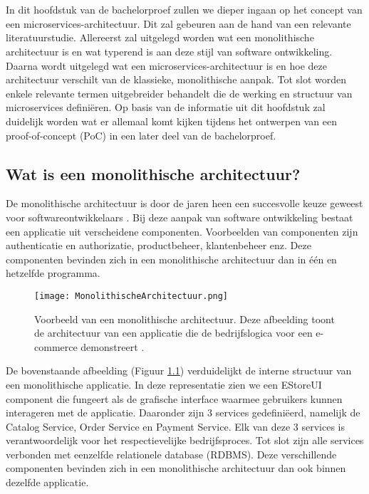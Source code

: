 \chapter{}%
\label{ch:stand-van-zaken}

In dit hoofdstuk van de bachelorproef zullen we dieper ingaan op het concept van een microservices-architectuur. Dit zal gebeuren aan de hand van een relevante literatuurstudie. Allereerst zal uitgelegd worden wat een monolithische architectuur is en wat typerend is aan deze stijl van software ontwikkeling. Daarna wordt uitgelegd wat een microservices-architectuur is en hoe deze architectuur verschilt van de klassieke, monolithische aanpak. Tot slot worden enkele relevante termen uitgebreider behandelt die de werking en structuur van microservices definiëren. Op basis van de informatie uit dit hoofdstuk zal duidelijk worden wat er allemaal komt kijken tijdens het ontwerpen van een proof-of-concept (PoC) in een later deel van de bachelorproef.

\section{Wat is een monolithische architectuur?}

De monolithische architectuur is door de jaren heen een succesvolle keuze geweest voor softwareontwikkelaars \autocite{Gos2020}. Bij deze aanpak van software ontwikkeling bestaat een applicatie uit verscheidene componenten. Voorbeelden van componenten zijn authenticatie en authorizatie, productbeheer, klantenbeheer enz. Deze componenten bevinden zich in een monolithische architectuur dan in één en hetzelfde programma.

\begin{figure}[H]
  \centering
  \texttt{[image: MonolithischeArchitectuur.png]}
  \caption[Voorstelling van een monolitische architectuur]{\label{fig:monolithische architectuur}Voorbeeld van een monolithische architectuur. Deze afbeelding toont de architectuur van een applicatie die de bedrijfslogica voor een e-commerce demonstreert \autocite{Gos2020}.}
\end{figure}

De bovenstaande afbeelding (Figuur \ref{fig:monolithische architectuur}) verduidelijkt de interne structuur van een monolithische applicatie. In deze representatie zien we een EStoreUI component die fungeert als de grafische interface waarmee gebruikers kunnen interageren met de applicatie. Daaronder zijn 3 services gedefiniëerd, namelijk de Catalog Service, Order Service en Payment Service. Elk van deze 3 services is verantwoordelijk voor het respectievelijke bedrijfsproces. Tot slot zijn alle services verbonden met eenzelfde relationele database (RDBMS). Deze verschillende componenten bevinden zich in een monolithische architectuur dan ook binnen dezelfde applicatie.\newline

